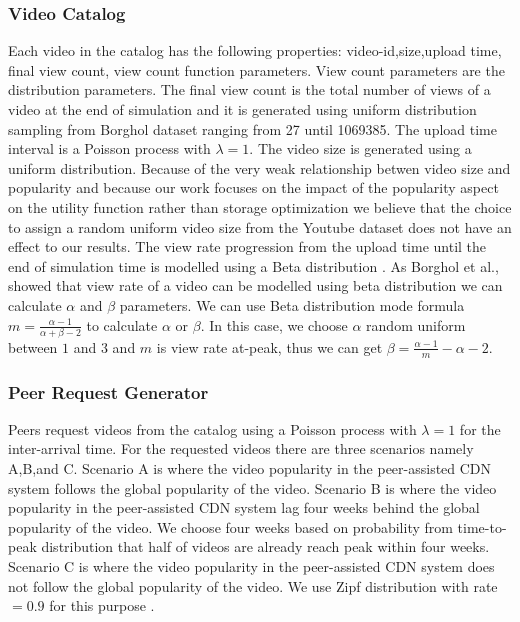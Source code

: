\documentclass[10pt,final,journal,a4paper]{IEEEtran}
\begin{document}
\subsubsection{Video Catalog}\label{catalog}
Each video in the catalog has the following properties: 
video-id,size,upload time, final view count, view count function parameters. 
View count parameters are the distribution parameters.
The final view count is the total number of views of a video at the end of simulation and it is generated using uniform distribution sampling from Borghol dataset ranging from 27 until 1069385.
The upload time interval is a Poisson process with $\lambda=1$.
The video size is generated using a uniform distribution.
Because of the very weak relationship betwen video size and popularity \cite{abhari2010workload} and because our work focuses on the impact of the popularity aspect on the utility function rather than storage optimization we believe that the choice to assign a random uniform video size from the Youtube dataset does not have an effect to our results. 
The view rate progression from the upload time until the end of simulation time is modelled using a Beta distribution \cite{Borghol:2011:CMP:2039452.2039717}.
As Borghol et al.,\cite{Borghol:2011:CMP:2039452.2039717} showed that view rate of a video can be modelled using beta distribution we can calculate $\alpha$ and $\beta$ parameters.
We can use Beta distribution mode formula $m=\frac{\alpha-1}{\alpha+\beta-2}$ to calculate $\alpha$ or $\beta$. 
In this case, we choose $\alpha$ random uniform between $1$ and $3$ and $m$ is view rate at-peak, thus we can get $\beta=\frac{\alpha-1}{m}-\alpha-2$.


\subsubsection{Peer Request Generator}\label{peerrequest}
Peers request videos from the catalog using a Poisson process with $\lambda=1$ \cite{Zink:2009:CYN:1502814.1502987} for the inter-arrival time.
For the requested videos there are three scenarios namely A,B,and C.
Scenario A is where the video popularity in the peer-assisted CDN system follows the global popularity of the video.
Scenario B is where the video popularity in the peer-assisted CDN system lag four weeks behind the global popularity of the video. 
We choose four weeks based on probability from time-to-peak distribution that half of videos are already reach peak within four weeks.
Scenario C is where the video popularity in the peer-assisted CDN system does not follow the global popularity of the video. 
We use Zipf distribution with rate$=0.9$ for this purpose \cite{6654887}.
\end{document}
